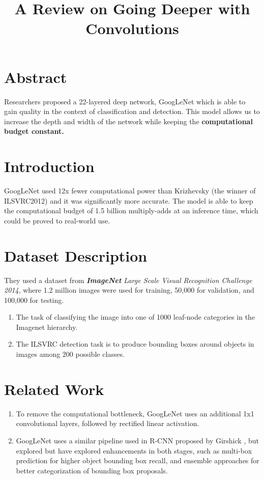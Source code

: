 \documentclass[12pt]{article}
\title{A Review on Going Deeper with Convolutions}
\date{}
\begin{document}
\maketitle

\section{Abstract}
Researchers proposed a 22-layered deep network, GoogLeNet which is able to gain quality in the context of classification and detection. This model allows us to increase the depth and width of the network while keeping the \textbf{computational budget constant.}

\section{Introduction}
GoogLeNet used 12x fewer computational power than Krizhevsky \cite{hinton2012improving} (the winner of ILSVRC2012) and it was significantly more accurate. The model is able to keep the  computational budget of 1.5 billion multiply-adds at an inference time, which could be proved to real-world use. 

\section{Dataset Description}
They used a dataset from \textit{\textbf{ImageNet} Large Scale Visual Recognition Challenge 2014}, where 1.2 million images were used for training, 50,000 for validation, and 100,000 for testing. 
\begin{enumerate}
    \item The task of classifying the image into one of 1000 leaf-node categories in the Imagenet hierarchy.
    \item The ILSVRC detection task is to produce bounding boxes around objects in images among 200 possible classes.
\end{enumerate}

\section{Related Work}
\begin{enumerate}
    \item To remove the computational bottleneck, GoogLeNet uses an additional 1x1 convolutional layers, followed by rectified linear activation. \cite{lin2013network}
    \item GoogLeNet uses a similar pipeline used in R-CNN proposed by Girshick \cite{girshick2014rich}, but explored but have explored enhancements in both stages, such as multi-box \cite{erhan2014scalable} prediction for higher object bounding box recall, and ensemble approaches for better categorization of bounding box proposals. 
\end{enumerate}
\end{document}
